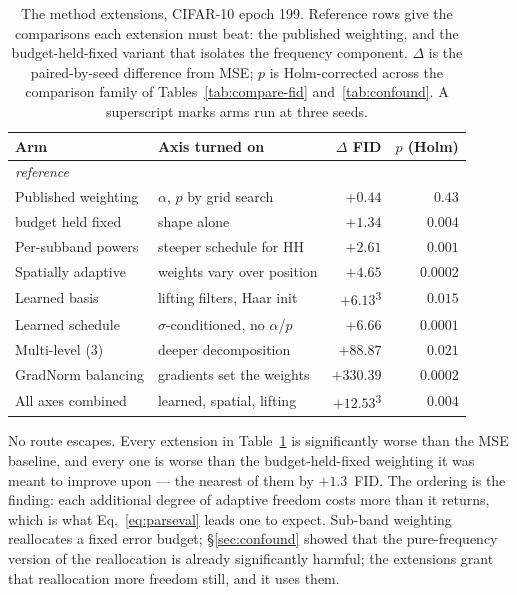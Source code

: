 \begin{table}[t]
\centering
\small
\caption{The method extensions, CIFAR-10 epoch \num{199}. Reference rows give
the comparisons each extension must beat: the published weighting, and the
budget-held-fixed variant that isolates the frequency component.
$\Delta$ is the paired-by-seed difference from MSE; $p$ is Holm-corrected
across the comparison family of Tables~\ref{tab:compare-fid}
and~\ref{tab:confound}. A superscript marks arms run at three seeds.}
\label{tab:extensions}
\begin{tabular}{llrr}
\toprule
Arm & Axis turned on & $\Delta$ FID & $p$ (Holm) \\
\midrule
\multicolumn{4}{l}{\emph{reference}} \\
Published weighting & $\alpha$, $p$ by grid search & $+0.44$ & $0.43$ \\
\quad budget held fixed & shape alone & $+1.34$ & $0.004$ \\
\midrule
Per-subband powers & steeper schedule for HH & $+2.61$ & $0.001$ \\
Spatially adaptive & weights vary over position & $+4.65$ & $0.0002$ \\
Learned basis & lifting filters, Haar init & $+6.13$\textsuperscript{3} & $0.015$ \\
Learned schedule & $\sigma$-conditioned, no $\alpha$/$p$ & $+6.66$ & $0.0001$ \\
Multi-level (3) & deeper decomposition & $+88.87$ & $0.021$ \\
GradNorm balancing & gradients set the weights & $+330.39$ & $0.0002$ \\
All axes combined & learned, spatial, lifting & $+12.53$\textsuperscript{3} & $0.004$ \\
\bottomrule
\end{tabular}
\end{table}

No route escapes. Every extension in Table~\ref{tab:extensions} is
significantly worse than the MSE baseline, and every one is worse than the
budget-held-fixed weighting it was meant to improve upon --- the nearest of
them by $+1.3$~FID. The ordering is the finding: each additional degree of
adaptive freedom costs more than it returns, which is what
Eq.~\ref{eq:parseval} leads one to expect. Sub-band weighting reallocates a
fixed error budget; \S\ref{sec:confound} showed that the pure-frequency
version of the reallocation is already significantly harmful; the extensions
grant that reallocation more freedom still, and it uses them.

